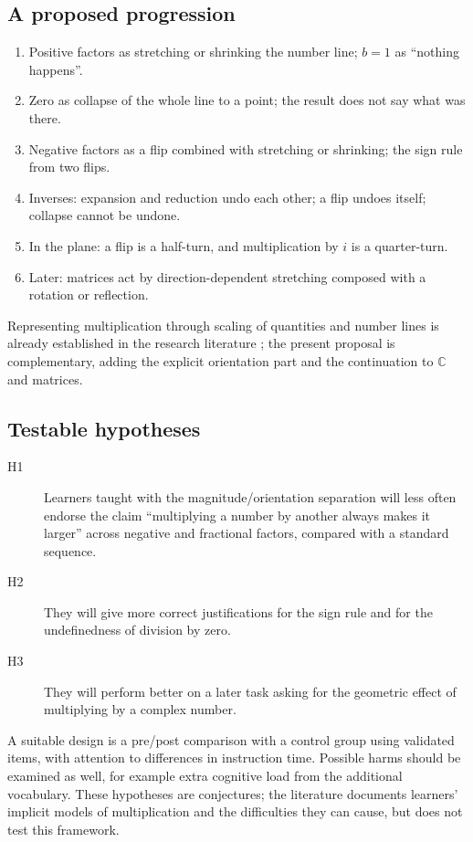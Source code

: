 \documentclass[12pt]{article}
\theoremstyle{definition}
\theoremstyle{remark}
\newcommand{\C}{\mathbb{C}}
\begin{document}
\subsection{A proposed progression}
\begin{enumerate}
\item Positive factors as stretching or shrinking the number line; $b=1$ as ``nothing happens''.
\item Zero as collapse of the whole line to a point; the result does not say what was there.
\item Negative factors as a flip combined with stretching or shrinking; the sign rule from two flips.
\item Inverses: expansion and reduction undo each other; a flip undoes itself; collapse cannot be undone.
\item In the plane: a flip is a half-turn, and multiplication by $i$ is a quarter-turn.
\item Later: matrices act by direction-dependent stretching composed with a rotation or reflection.
\end{enumerate}
Representing multiplication through scaling of quantities and number lines is already established in the research literature \cite{thompson2003}; the present proposal is complementary, adding the explicit orientation part and the continuation to $\C$ and matrices.

\subsection{Testable hypotheses}
\begin{description}
\item[H1] Learners taught with the magnitude/orientation separation will less often endorse the claim ``multiplying a number by another always makes it larger'' across negative and fractional factors, compared with a standard sequence.
\item[H2] They will give more correct justifications for the sign rule and for the undefinedness of division by zero.
\item[H3] They will perform better on a later task asking for the geometric effect of multiplying by a complex number.
\end{description}
A suitable design is a pre/post comparison with a control group using validated items, with attention to differences in instruction time. Possible harms should be examined as well, for example extra cognitive load from the additional vocabulary. These hypotheses are conjectures; the literature \cite{fischbein1985,greer1992} documents learners' implicit models of multiplication and the difficulties they can cause, but does not test this framework.
\end{document}
